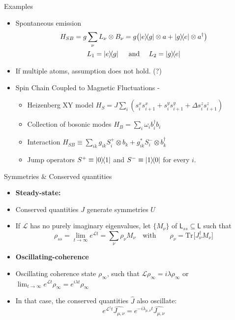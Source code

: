 \documentclass[10pt,xcolor={table,dvipsnames},t]{beamer}
\newcommand{\outerprod}[2]{\ket{#1}\!\!\bra{#2}}
\newcommand{\tr}[2]{\text{Tr}_{#1}\bigl[#2\bigr]}
\newcommand{\circledmathfrak}[1]{
  \tikz[baseline=(char.base)]{
    \node[shape=circle,draw,inner sep=2pt] (char) {$\mathfrak{#1}$};
  }
}
\begin{document}
\begin{frame}{Examples}
  \begin{itemize}
    \item<1-> Spontaneous emission 
      \begin{gather}
          H_{SB} = g\sum_\nu L_\nu \otimes B_\nu = g\bigl( \outerprod{e}{g}\otimes a + \outerprod{g}{e}\otimes a^\dag \bigr) \notag \\
      L_1 = \outerprod{e}{g} \quad \text{ and } \quad L_2 = \outerprod{g}{e} \notag
    \end{gather}
    \item<2-> If multiple atoms, assumption \circledmathfrak{a} does not hold. (?)
    \item<3-> Spin Chain Coupled to Magnetic Fluctuations - 
      \begin{itemize}
        \item <3-> Heizenberg XY model $H_S = J\sum_i(s_i^x s_{i+1}^x +s_i^y s_{i+1}^y + \Delta s_i^z s_{i+1}^z)$
        \item <3-> Collection of bosonic modes $H_B = \sum_i \omega_i b_i^\dag b_i$
        \item <4-> Interaction $H_{SB} \equiv \sum_{ik}g_{ik}S^+_i \otimes b_k + g_{ik}^* S_i^- \otimes b_k^\dag$
        \item <4-> Jump operators $S^+ \equiv \outerprod{0}{1}$ and $S^- \equiv \outerprod{1}{0}$ for every $i$.
      \end{itemize}
  \end{itemize}
\end{frame}

\begin{frame}{Symmetries \& Conserved quantities}
  \begin{itemize}
    \item<1->[] \textbf{Steady-state:}
    \item<1-> Conserved quantities $J$ generate symmetries $U$
    \item<1-> If $\mathcal{L}$ has no purely imaginary eigenvalues, let $\{M_\nu\}$ of 
      $\mathsf{L}_{ss} \subseteq \mathsf{L}$ such that  
      $$
      \rho_{ss} = \lim_{t \rightarrow \infty} e^{\mathcal{L}t} = \sum_{\nu}\rho_\nu M_\nu \quad \text{with} \qquad \rho_\nu = 
      \tr{}{J_\nu^\dag M_\nu}
      $$

    \item<2->[] \textbf{Oscillating-coherence}
    \item<2-> Oscillating coherence state $\rho_\infty$, such that $\mathcal{L}\rho_\infty = i\lambda \rho_\infty$ or 
      $\lim_{t \rightarrow \infty }e^{\mathcal{L}t}\rho_\infty = e^{i\lambda t}\rho_\infty$
    \item<2-> In that case, the conserved quantities $\widehat{J}$ also oscillate: 
      $$e^{\mathcal{L} ^\dag t} \widehat{J_{\mu, \nu}} = e^{- i\lambda_{\mu, \nu}t}\widehat{J_{\mu, \nu}} $$
  \end{itemize}

\end{frame}
\end{document}
